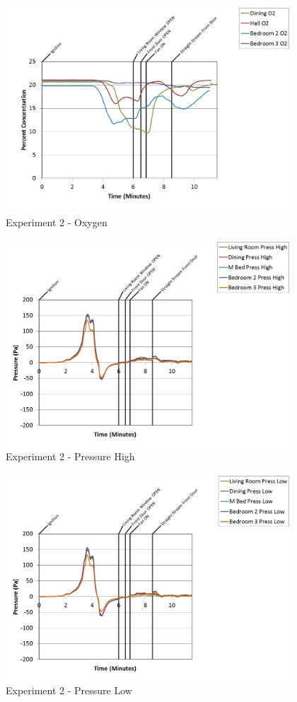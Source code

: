 \documentclass{article}
\begin{document}
\begin{appendices}
\begin{figure}[h!]
	\centering
	\includegraphics[height=3.05in]{0_Images/Results_Charts/Exp_2_Charts/Oxygen.png}
	\caption{Experiment 2 - Oxygen}
\end{figure}

\clearpage

\begin{figure}[h!]
	\centering
	\includegraphics[height=3.05in]{0_Images/Results_Charts/Exp_2_Charts/PressureHigh.png}
	\caption{Experiment 2 - Pressure High}
\end{figure}


\begin{figure}[h!]
	\centering
	\includegraphics[height=3.05in]{0_Images/Results_Charts/Exp_2_Charts/PressureLow.png}
	\caption{Experiment 2 - Pressure Low}
\end{figure}


\end{appendices}
\end{document}

